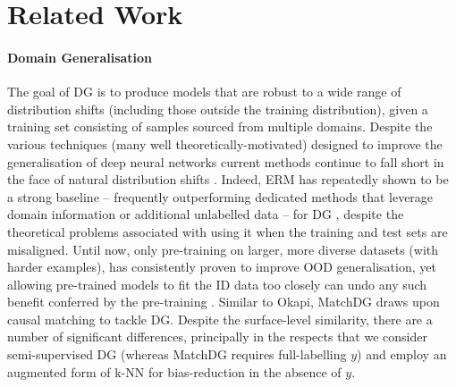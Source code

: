 \section{Related Work}\label{sec:related_work}
\paragraph{Domain Generalisation} 
%
The goal of \acf{DG} is to produce models that are robust to a wide range of distribution shifts
(including those outside the training distribution), given a training set consisting of samples
sourced from multiple domains.
%
Despite the various techniques (many well theoretically-motivated) designed to improve the
generalisation of deep neural networks current methods continue to fall short in the face of
natural distribution shifts \citep{gulrajani2020search, koh2021wilds}.
%
Indeed, ERM has repeatedly shown to be a strong baseline -- frequently outperforming dedicated
methods that leverage domain information or additional unlabelled data -- for \ac{DG}
\citep{gulrajani2020search, SagWeiLeeGaoetal22}, despite the theoretical problems associated with
using it when the training and test sets are misaligned.
%
Until now, only pre-training on larger, more diverse datasets (with harder examples), has
consistently proven to improve OOD generalisation, yet allowing pre-trained models to fit the ID
data too closely can undo any such benefit conferred by the pre-training
\citep{andreassen2021evolution, kim2022broad, taori2020measuring, wiles2022a}.
%
%
Similar to Okapi, MatchDG \citep{mahajan2021domain} draws upon causal matching to tackle \ac{DG}.
Despite the surface-level similarity, there are a number of significant differences, principally in
the respects that we consider semi-supervised \ac{DG} (whereas MatchDG requires full-labelling
\wrt{} $y$) and employ an augmented form of k-NN for bias-reduction in the absence of $y$.

